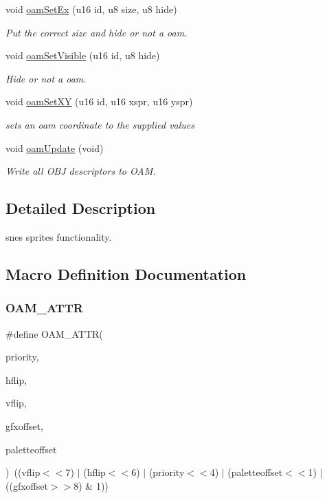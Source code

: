 \begin{DoxyCompactItemize}
void \hyperlink{a00365_a4120a8ff32c39973babeca3615a0a2fd}{oam\+Set\+Ex} (u16 id, u8 size, u8 hide)
\begin{DoxyCompactList}\small\item\em Put the correct size and hide or not a oam. \end{DoxyCompactList}\item 
void \hyperlink{a00365_a35a0da9852240ef41b5030ed21b6eeb2}{oam\+Set\+Visible} (u16 id, u8 hide)
\begin{DoxyCompactList}\small\item\em Hide or not a oam. \end{DoxyCompactList}\item 
void \hyperlink{a00365_a4b8ea6388961b74cc228104a97eaecbd}{oam\+Set\+XY} (u16 id, u16 xspr, u16 yspr)
\begin{DoxyCompactList}\small\item\em sets an oam coordinate to the supplied values \end{DoxyCompactList}\item 
\mbox{\label{a00365_a880416b4272104d4e9b83ea5331b6260}} 
void \hyperlink{a00365_a880416b4272104d4e9b83ea5331b6260}{oam\+Update} (void)
\begin{DoxyCompactList}\small\item\em Write all O\+BJ descriptors to O\+AM. \end{DoxyCompactList}\end{DoxyCompactItemize}


\subsection{Detailed Description}
snes sprites functionality. 



\subsection{Macro Definition Documentation}
\mbox{\label{a00365_a3e2d51ca1a0ddadfbb339450c70f4f2f}} 
\subsubsection{\texorpdfstring{O\+A\+M\+\_\+\+A\+T\+TR}{OAM\_ATTR}}
{\footnotesize\ttfamily \#define O\+A\+M\+\_\+\+A\+T\+TR(\begin{DoxyParamCaption}\item[{}]{priority,  }\item[{}]{hflip,  }\item[{}]{vflip,  }\item[{}]{gfxoffset,  }\item[{}]{paletteoffset }\end{DoxyParamCaption})~((vflip$<$$<$7) $\vert$ (hflip$<$$<$6) $\vert$ (priority$<$$<$4) $\vert$ (paletteoffset$<$$<$1) $\vert$ ((gfxoffset$>$$>$8) \& 1))}



